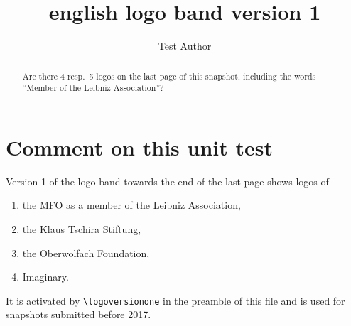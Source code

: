 \documentclass{snapshotmfo}
\author{Test Author}
\title{english logo band version 1}
\begin{document}
\begin{abstract}
Are there 4 resp.\ 5 logos on the last page of this snapshot, including the words ``Member of the Leibniz Association''?
\end{abstract}

\section{Comment on this unit test}
Version 1 of the logo band towards the end of the last page shows logos of
\begin{enumerate}
  \item the MFO as a member of the Leibniz Association,
  \item the Klaus Tschira Stiftung,
  \item the Oberwolfach Foundation,
  \item Imaginary.
\end{enumerate}
It is activated by \verb+\logoversionone+ in the preamble of this file
and is used for snapshots submitted before 2017.
\end{document}
